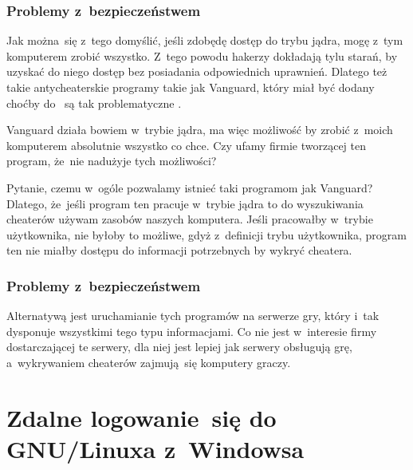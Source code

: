 \documentclass[10pt,t]{beamer}
\begin{document}
\begin{frame}
  \frametitle{Problemy z~bezpieczeństwem}


  Jak można~się z~tego domyślić, jeśli zdobędę dostęp do trybu jądra, mogę
  z~tym komputerem zrobić wszystko. Z~tego powodu hakerzy dokładają tylu
  starań, by uzyskać do niego dostęp \alert{bez} posiadania odpowiednich
  uprawnień. Dlatego też takie antycheaterskie programy takie jak Vanguard,
  który miał być dodany choćby do
  ~są tak problematyczne
  \parencite{Low-Level-Why-Riots-anti-cheat-is-a-HUGE-problem-Ver-2024}.

  Vanguard działa bowiem w~trybie jądra, ma więc możliwość by zrobić
  z~moich komputerem absolutnie wszystko co chce. Czy ufamy firmie
  tworzącej ten program, że~nie nadużyje tych możliwości?

  Pytanie, czemu w~ogóle pozwalamy istnieć taki programom jak Vanguard?
  Dlatego, że~jeśli program ten pracuje w~trybie jądra to do wyszukiwania
  cheaterów używam zasobów \alert{naszych} komputera. Jeśli pracowałby
  w~trybie użytkownika, nie byłoby to możliwe, gdyż z~definicji trybu
  użytkownika, program ten nie miałby dostępu do informacji potrzebnych by
  wykryć cheatera.

\end{frame}





\begin{frame}
  \frametitle{Problemy z~bezpieczeństwem}


  Alternatywą jest uruchamianie tych programów na serwerze
  gry, który i~tak dysponuje wszystkimi tego typu informacjami. Co nie jest
  w~interesie firmy dostarczającej te serwery, dla niej jest lepiej jak
  serwery obsługują grę, a~wykrywaniem cheaterów zajmują~się komputery
  graczy.

\end{frame}










\section{Zdalne logowanie~się do GNU/Linuxa z~Windowsa}
\end{document}
